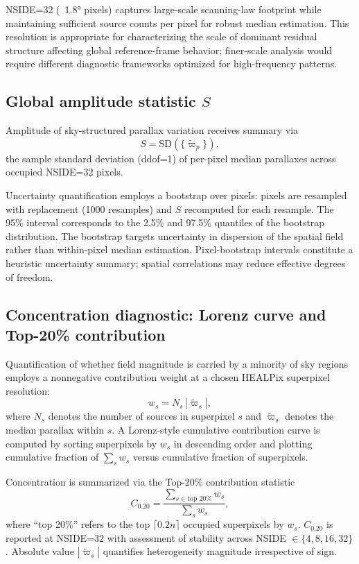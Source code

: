 NSIDE=32 (~1.8° pixels) captures large-scale scanning-law footprint while maintaining sufficient source counts per pixel for robust median estimation. This resolution is appropriate for characterizing the scale of dominant residual structure affecting global reference-frame behavior; finer-scale analysis would require different diagnostic frameworks optimized for high-frequency patterns.

\subsection{\texorpdfstring{Global amplitude statistic $S$}{Global amplitude statistic S} }
Amplitude of sky-structured parallax variation receives summary via
\[
S = \mathrm{SD}\left(\{\tilde{\varpi}_{p}\}\right),
\]
the sample standard deviation (ddof=1) of per-pixel median parallaxes across occupied NSIDE=32 pixels.

Uncertainty quantification employs a bootstrap over pixels: pixels are resampled with replacement (1000 resamples) and $S$ recomputed for each resample. The 95\% interval corresponds to the 2.5\% and 97.5\% quantiles of the bootstrap distribution. The bootstrap targets uncertainty in dispersion of the spatial field rather than within-pixel median estimation. Pixel-bootstrap intervals constitute a heuristic uncertainty summary; spatial correlations may reduce effective degrees of freedom.

\subsection{\texorpdfstring{Concentration diagnostic: Lorenz curve and Top-20\% contribution}{Concentration diagnostic: Lorenz curve and Top-20 percent contribution}}
Quantification of whether field magnitude is carried by a minority of sky regions employs a nonnegative contribution weight at a chosen HEALPix superpixel resolution:
\[
w_s = N_s \, |\tilde{\varpi}_s|,
\]
where $N_s$ denotes the number of sources in superpixel $s$ and $\tilde{\varpi}_s$ denotes the median parallax within $s$. A Lorenz-style cumulative contribution curve is computed by sorting superpixels by $w_s$ in descending order and plotting cumulative fraction of $\sum_s w_s$ versus cumulative fraction of superpixels.

Concentration is summarized via the Top-20\% contribution statistic
\[
C_{0.20} = \frac{\sum_{s \in \text{top 20\%}} w_s}{\sum_s w_s},
\]
where ``top 20\%'' refers to the top $\lceil 0.2 n \rceil$ occupied superpixels by $w_s$. $C_{0.20}$ is reported at NSIDE=32 with assessment of stability across NSIDE $\in \{4,8,16,32\}$. Absolute value $|\tilde{\varpi}_s|$ quantifies heterogeneity magnitude irrespective of sign.

